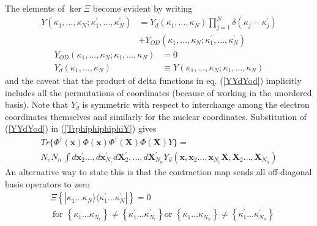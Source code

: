 \documentclass[aps,preprint]{revtex4}%
\begin{document}
The elements of $\ker\Xi$ become evident by writing
\begin{align}
Y(\kappa_{1},\ldots,\kappa_{N};\kappa_{1}^{\prime},\ldots,\kappa_{N}^{\prime
})  &  =Y_{d}(\kappa_{1},\ldots,\kappa_{N})\prod_{j=1}^{N}\delta(\kappa
_{j}-\kappa_{j}^{\prime})\nonumber\\
&  +Y_{OD}(\kappa_{1},\ldots,\kappa_{N};\kappa_{1}^{\prime},\ldots,\kappa
_{N}^{\prime}) \label{YYdYod}%
\end{align}%
\begin{align}
Y_{OD}(\kappa_{1},\ldots,\kappa_{N};\kappa_{1},\ldots,\kappa_{N})  &
=0\nonumber\\
Y_{d}(\kappa_{1},\ldots,\kappa_{N})  &  \equiv Y(\kappa_{1},\ldots,\kappa
_{N};\kappa_{1},\ldots,\kappa_{N})
\end{align}
and the caveat that the product of delta functions in eq. (\ref{YYdYod})
implicitly includes all the permutations of coordinates (because of working in
the unordered basis). Note that $Y_{d}$ is symmetric with respect to
interchange among the electron coordinates themselves and similarly for the
nuclear coordinates. Substitution of (\ref{YYdYod}) in (\ref{TrphiphiphiphiY})
gives
\begin{gather}
Tr\!\{\Phi^{\dagger}(\mathbf{x})\Phi(\mathbf{x})\Phi^{\dagger}(\mathbf{X}%
)\Phi(\mathbf{X})Y\}=\nonumber\\
N_{e}N_{n}\,\int d\mathbf{x}_{2}^{\prime}\ldots,d\mathbf{x}_{N_{e}}^{\prime
}d\mathbf{X}_{2}^{\prime},\ldots,d\mathbf{X}_{N_{n}}^{\prime}Y_{d}%
(\mathbf{x},\mathbf{x}_{2}\ldots,\mathbf{x}_{N_{e}}\mathbf{X},\mathbf{X}%
_{2}\ldots,\mathbf{X}_{N_{n}}) \label{ContrYtoYd}%
\end{gather}
An alternative way to state this is that the contraction map sends all
off-diagonal basis operators to zero
\begin{align}
&  \Xi\left\{  |\kappa_{1}\ldots\kappa_{N}\rangle\langle\kappa_{1}^{\prime
}\ldots\kappa_{N}^{\prime}|\right\}  =0\nonumber\\
&  \;\text{{for }}\left\{  \kappa_{1}\ldots\kappa_{N_{e}}\right\}
\neq\left\{  \kappa_{1}^{\prime}\ldots\kappa_{N_{e}}^{\prime}\right\}  \text{
or }\left\{  \kappa_{1}\ldots\kappa_{N_{n}}\right\}  \neq\left\{  \kappa
_{1}^{\prime}\ldots\kappa_{N_{n}}^{\prime}\right\}  \label{zeroeta}%
\end{align}
\end{document}
